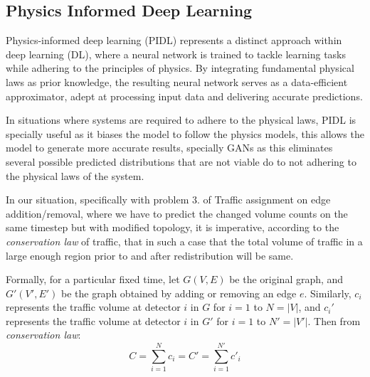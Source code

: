 \subsection{\textbf{Physics Informed Deep Learning}}

Physics-informed deep learning (PIDL) represents a distinct approach within deep learning (DL), where a neural network is trained to tackle learning tasks while adhering to the principles of physics. By integrating fundamental physical laws as prior knowledge, the resulting neural network serves as a data-efficient approximator, adept at processing input data and delivering accurate predictions.

In situations where systems are required to adhere to the physical laws, PIDL is specially useful as it biases the model to follow the physics models, this allows the model to generate more accurate results, specially GANs as this eliminates several possible predicted distributions that are not viable do to not adhering to the physical laws of the system.

In our situation, specifically with problem 3. of Traffic assignment on edge addition/removal, where we have to predict the changed volume counts on the same timestep but with modified topology, it is imperative, according to the \textit{conservation law} of traffic, that in such a case that the total volume of traffic in a large enough region prior to and after redistribution will be same.

Formally, for a particular fixed time, let \( G(V,E) \) be the original graph, and \( G'(V',E') \) be the graph obtained by adding or removing an edge \( e \). Similarly, \( c_i \) represents the traffic volume at detector \( i \) in \( G \) for \( i = 1 \) to \( N = |V| \), and \( c_i' \) represents the traffic volume at detector \( i \) in \( G' \) for \( i = 1 \) to \( N' = |V'| \). Then from \textit{conservation law}:
\begin{equation}
    C = \sum_{i=1}^{N} c_i = C' = \sum_{i=1}^{N'} c'_i \tag{5}
\end{equation}

